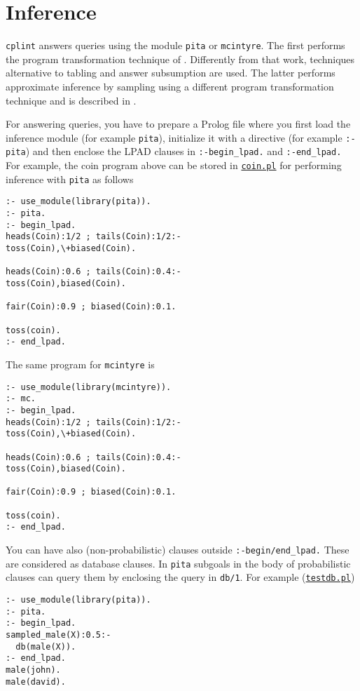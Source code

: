 \section{Inference}
\label{inf}
\texttt{cplint} answers queries using the module \verb|pita| or \verb|mcintyre|. The first performs the program transformation technique of \cite{RigSwi10-ICLP10-IC}. Differently from that work, techniques alternative to tabling and answer subsumption are used. The latter performs approximate inference by sampling
using a different program transformation technique and is described in \cite{Rig13-FI-IJ}.

For answering queries, you have to prepare a Prolog file where you first load the inference module (for example \verb|pita|), initialize it with a directive (for example \verb|:- pita|) and then enclose the LPAD
clauses in \verb|:-begin_lpad.| and \verb|:-end_lpad.| For example, the coin program above can be stored in \href{http://cplint.lamping.unife.it/example/inference/coin.pl}{\texttt{coin.pl}} for performing inference
with \verb|pita| as follows
\begin{verbatim}
:- use_module(library(pita)).
:- pita.
:- begin_lpad.
heads(Coin):1/2 ; tails(Coin):1/2:- 
toss(Coin),\+biased(Coin).

heads(Coin):0.6 ; tails(Coin):0.4:- 
toss(Coin),biased(Coin).

fair(Coin):0.9 ; biased(Coin):0.1.

toss(coin).
:- end_lpad.
\end{verbatim}
The same program for \verb|mcintyre| is
\begin{verbatim}
:- use_module(library(mcintyre)).
:- mc.
:- begin_lpad.
heads(Coin):1/2 ; tails(Coin):1/2:- 
toss(Coin),\+biased(Coin).

heads(Coin):0.6 ; tails(Coin):0.4:- 
toss(Coin),biased(Coin).

fair(Coin):0.9 ; biased(Coin):0.1.

toss(coin).
:- end_lpad.
\end{verbatim}
You can have also (non-probabilistic) clauses outside \verb|:-begin/end_lpad.| These are considered as database clauses.
In \verb|pita| subgoals in the body of probabilistic clauses can query them by enclosing the query in \verb|db/1|.
For example (\href{http://cplint.lamping.unife.it/example/inference/testdb.pl}{\texttt{testdb.pl}})
\begin{verbatim}
:- use_module(library(pita)).
:- pita.
:- begin_lpad.
sampled_male(X):0.5:-
  db(male(X)).
:- end_lpad.
male(john).
male(david).
\end{verbatim}
